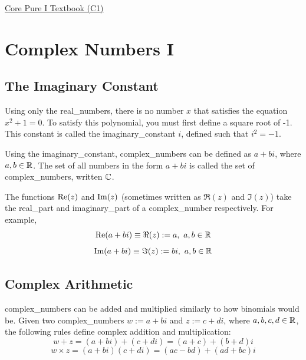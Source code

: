 \href{https://drive.google.com/drive/folders/1le-4uediDAlxbglAtcbnSlPrLuQiPTE3}{\hypertarget{book:C1}{Core Pure I Textbook (C1)}}

\section{Complex Numbers I} \label{complex_numbers_i}

    \subsection{The Imaginary Constant}
        Using only the \glspl{real_number}, there is no number $x$ that satisfies the equation $x^2+1=0$.
        To satisfy this \gls{polynomial}, you must first define a square root of -1.
        This constant is called the \gls{imaginary_constant} $i$, defined such that $i^2=-1$.
        
        Using the \gls{imaginary_constant}, \glspl{complex_number} can be defined as $a+bi$, where $a,b\in\operatorname{\mathbb{R}}$.
        The set of all numbers in the form $a+bi$ is called the set of \glspl{complex_number}, written $\operatorname{\mathbb{C}}$.

        The functions $\operatorname{Re}(z)$ and $\operatorname{Im}(z)$ (sometimes written as $\Re(z)$ and $\Im(z)$) take the \gls{real_part} and \gls{imaginary_part} of a \gls{complex_number} respectively.
        For example,
        \begin{equation} \label{eq:real_part}
            \text{Re}(a+bi)\equiv\Re(z):=a,\ a,b\in\operatorname{\mathbb{R}}
        \end{equation}
        \begin{equation} \label{eq:imaginary_part}
            \text{Im}(a+bi)\equiv\Im(z):=bi,\ a,b\in\operatorname{\mathbb{R}}
        \end{equation}

    \subsection{Complex Arithmetic}
        \Glspl{complex_number} can be added and multiplied similarly to how binomials would be.
        Given two \glspl{complex_number} $w:=a+bi$ and $z:=c+di$, where $a,b,c,d\in\operatorname{\mathbb{R}}$, the following rules define complex addition and multiplication:
        \begin{equation} \label{eqn:complex_addition}
            w+z=(a+bi)+(c+di)=(a+c)+(b+d)i
        \end{equation}
        \begin{equation} \label{eqn:complex_multiplication}
            w\times z=(a+bi)(c+di)=(ac-bd)+(ad+bc)i
        \end{equation}

